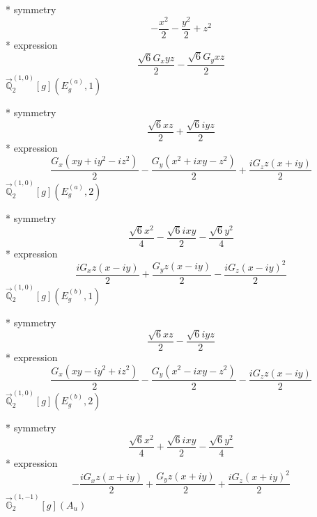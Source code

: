 \documentclass[fleqn,8pt]{jsarticle}
\begin{document}
\noindent\quad ** symmetry
\begin{dmath*}
- \frac{x^{2}}{2} - \frac{y^{2}}{2} + z^{2}
\end{dmath*}
\noindent\quad ** expression
\begin{dmath*}
\frac{\sqrt{6} G_{x} y z}{2} - \frac{\sqrt{6} G_{y} x z}{2}
\end{dmath*}
\noindent\quad $\vec{\mathbb{Q}}_{2}^{(1,0)}[g](E_{g}^{(a)},1)$

\noindent\quad ** symmetry
\begin{dmath*}
\frac{\sqrt{6} x z}{2} + \frac{\sqrt{6} i y z}{2}
\end{dmath*}
\noindent\quad ** expression
\begin{dmath*}
\frac{G_{x} \left(x y + i y^{2} - i z^{2}\right)}{2} - \frac{G_{y} \left(x^{2} + i x y - z^{2}\right)}{2} + \frac{i G_{z} z \left(x + i y\right)}{2}
\end{dmath*}
\noindent\quad $\vec{\mathbb{Q}}_{2}^{(1,0)}[g](E_{g}^{(a)},2)$

\noindent\quad ** symmetry
\begin{dmath*}
\frac{\sqrt{6} x^{2}}{4} - \frac{\sqrt{6} i x y}{2} - \frac{\sqrt{6} y^{2}}{4}
\end{dmath*}
\noindent\quad ** expression
\begin{dmath*}
\frac{i G_{x} z \left(x - i y\right)}{2} + \frac{G_{y} z \left(x - i y\right)}{2} - \frac{i G_{z} \left(x - i y\right)^{2}}{2}
\end{dmath*}
\noindent\quad $\vec{\mathbb{Q}}_{2}^{(1,0)}[g](E_{g}^{(b)},1)$

\noindent\quad ** symmetry
\begin{dmath*}
\frac{\sqrt{6} x z}{2} - \frac{\sqrt{6} i y z}{2}
\end{dmath*}
\noindent\quad ** expression
\begin{dmath*}
\frac{G_{x} \left(x y - i y^{2} + i z^{2}\right)}{2} - \frac{G_{y} \left(x^{2} - i x y - z^{2}\right)}{2} - \frac{i G_{z} z \left(x - i y\right)}{2}
\end{dmath*}
\noindent\quad $\vec{\mathbb{Q}}_{2}^{(1,0)}[g](E_{g}^{(b)},2)$

\noindent\quad ** symmetry
\begin{dmath*}
\frac{\sqrt{6} x^{2}}{4} + \frac{\sqrt{6} i x y}{2} - \frac{\sqrt{6} y^{2}}{4}
\end{dmath*}
\noindent\quad ** expression
\begin{dmath*}
- \frac{i G_{x} z \left(x + i y\right)}{2} + \frac{G_{y} z \left(x + i y\right)}{2} + \frac{i G_{z} \left(x + i y\right)^{2}}{2}
\end{dmath*}
\noindent\quad $\vec{\mathbb{G}}_{2}^{(1,-1)}[g](A_{u})$
\end{document}
